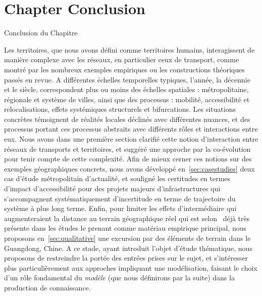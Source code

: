 





\newpage


\section*{Chapter Conclusion}{Conclusion du Chapitre}


Les territoires, que nous avons défini comme territoires humains, interagissent de manière complexe avec les réseaux, en particulier ceux de transport, comme montré par les nombreux exemples empiriques ou les constructions théoriques passés en revue. A différentes échelles temporelles typiques, l'année, la décennie et le siècle, correspondent plus ou moins des échelles spatiales : métropolitaine, régionale et système de villes, ainsi que des processus : mobilité, accessibilité et relocalisations, effets systémiques structurels et bifurcations. Les situations concrètes témoignent de réalités locales déclinés avec différentes nuances, et des processus portant ces processus abstraits avec différents rôles et interactions entre eux. Nous avons dans une première section clarifié cette notion d'interaction entre réseaux de transports et territoires, et suggéré une approche par la co-évolution pour tenir compte de cette complexité. Afin de mieux cerner ces notions sur des exemples géographiques concrets, nous avons développé en~\ref{sec:casestudies} deux cas d'étude métropolitain d'actualité, et souligné les certitudes en termes d'impact d'accessibilité pour des projets majeurs d'infrastructures qui s'accompagnent systématiquement d'incertitude en terme de trajectoire du système à plus long terme. Enfin, pour limiter les effets d'intermédiaire qui augmenteraient la distance au terrain géographique réel qui est selon~\cite{lefort2012terrain} déjà très présente dans les études le prenant comme matériau empirique principal, nous proposons en~\ref{sec:qualitative} une excursion par des éléments de terrain dans le Guangdong, Chine. A ce stade, ayant introduit l'objet d'étude thématique, nous proposons de restreindre la portée des entrées prises sur le sujet, et s'intéresser plus particulièrement aux approches impliquant une modélisation, faisant le choix d'un rôle fondamental du \emph{modèle} (que nous définirons par la suite) dans la production de connaissance.





